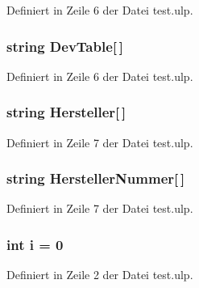Definiert in Zeile 6 der Datei test.\+ulp.

\hypertarget{test_8ulp_a44f73a7606acf532b5a5c0eb0aef6fbc}{}
\subsubsection[{Dev\+Table}]{\setlength{\rightskip}{0pt plus 5cm}string Dev\+Table\mbox{[}$\,$\mbox{]}}\label{test_8ulp_a44f73a7606acf532b5a5c0eb0aef6fbc}


Definiert in Zeile 6 der Datei test.\+ulp.

\hypertarget{test_8ulp_a03dd05fe151d0e9f9edf96078bc234d4}{}
\subsubsection[{Hersteller}]{\setlength{\rightskip}{0pt plus 5cm}string Hersteller\mbox{[}$\,$\mbox{]}}\label{test_8ulp_a03dd05fe151d0e9f9edf96078bc234d4}


Definiert in Zeile 7 der Datei test.\+ulp.

\hypertarget{test_8ulp_a6ba91b18d0979e207105d660a2010d8d}{}
\subsubsection[{Hersteller\+Nummer}]{\setlength{\rightskip}{0pt plus 5cm}string Hersteller\+Nummer\mbox{[}$\,$\mbox{]}}\label{test_8ulp_a6ba91b18d0979e207105d660a2010d8d}


Definiert in Zeile 7 der Datei test.\+ulp.

\hypertarget{test_8ulp_acb559820d9ca11295b4500f179ef6392}{}
\subsubsection[{i}]{\setlength{\rightskip}{0pt plus 5cm}int i = 0}\label{test_8ulp_acb559820d9ca11295b4500f179ef6392}


Definiert in Zeile 2 der Datei test.\+ulp.

\hypertarget{test_8ulp_ab66ed8e0098c0a86b458672a55a9cca9}{}

